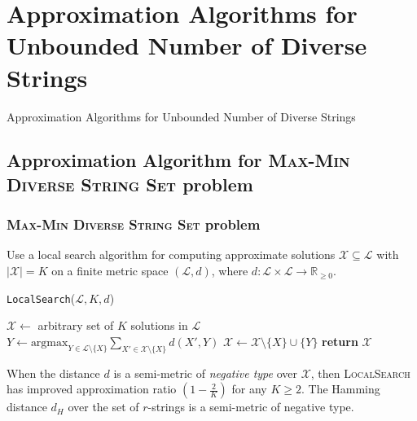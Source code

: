 \documentclass{beamer}
\begin{document}
\section{Approximation Algorithms for Unbounded Number of Diverse Strings}
\begin{frame}
    \begin{center}
        \huge{Approximation Algorithms for Unbounded Number of Diverse Strings}
    \end{center}
\end{frame}

\subsection{Approximation Algorithm for \textsc{Max-Min Diverse String Set} problem}
\begin{frame}
    \frametitle{\textsc{Max-Min Diverse String Set} problem}
    Use a local search algorithm for computing approximate solutions $\mathcal{X} \subseteq \mathcal{L}$ with $|\mathcal{X}| = K$ on a finite metric space $(\mathcal{L}, d)$, where $d: \mathcal{L} \times \mathcal{L} \to \mathbb{R}_{\geq 0}$.

    \begin{algorithm}[H] \label{alg:LocalSearch}
        \footnotesize{\caption{\texttt{LocalSearch}($\mathcal{L}, K, d$)}}
        \footnotesize{\begin{algorithmic}[1]
            \State $\mathcal{X} \gets$ arbitrary set of $K$ solutions in $\mathcal{L}$
                    \State $Y \gets \text{argmax}_{Y \in \mathcal{L} \setminus \{X\}} \sum_{X' \in \mathcal{X} \setminus \{X\}} d(X', Y)$
                    \State $\mathcal{X} \gets \mathcal{X} \setminus \{X\} \cup \{Y\}$
                \EndFor
            \EndFor
            \State \textbf{return} $\mathcal{X}$
        \end{algorithmic}}
    \end{algorithm}

    \begin{theorem}
        \small{When the distance $d$ is a semi-metric of \emph{negative type} over $\mathcal{X}$, then \textsc{LocalSearch} has improved approximation ratio $(1 - \frac{2}{K})$ for any $K \geq 2$. The Hamming distance $d_H$ over the set of $r$-strings is a semi-metric of negative type.}
    \end{theorem}
\end{frame}
\end{document}
